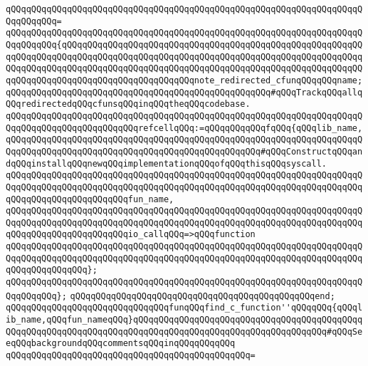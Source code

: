 \verb|qQQqqQQqqQQqqQQqqQQqqQQqqQQqqQQqqQQqqQQqqQQqqQQqqQQqqQQqqQQqqQQqqQQqqQQqqQQqqQQq=|\newline
\verb|qQQqqQQqqQQqqQQqqQQqqQQqqQQqqQQqqQQqqQQqqQQqqQQqqQQqqQQqqQQqqQQqqQQqqQQqqQQqqQQq{qQQqqQQqqQQqqQQqqQQqqQQqqQQqqQQqqQQqqQQqqQQqqQQqqQQqqQQqqQQqqQQqqQQqqQQqqQQqqQQqqQQqqQQqqQQqqQQqqQQqqQQqqQQqqQQqqQQqqQQqqQQqqQQqqQQqqQQqqQQqqQQqqQQqqQQqqQQqqQQqqQQqqQQqqQQqqQQqqQQqqQQqqQQqqQQqqQQqqQQqqQQqqQQqqQQqqQQqqQQqqQQqqQQqqQQqqQQqnote_redirected_cfunqQQqqQQqname;qQQqqQQqqQQqqQQqqQQqqQQqqQQqqQQqqQQqqQQqqQQqqQQqqQQq#qQQqTrackqQQqallqQQqredirectedqQQqcfunsqQQqinqQQqtheqQQqcodebase.|\newline
\newline
\verb|qQQqqQQqqQQqqQQqqQQqqQQqqQQqqQQqqQQqqQQqqQQqqQQqqQQqqQQqqQQqqQQqqQQqqQQqqQQqqQQqqQQqqQQqqQQqqQQqrefcellqQQq:=qQQqqQQqqQQqfqQQq{qQQqlib_name,qQQqqQQqqQQqqQQqqQQqqQQqqQQqqQQqqQQqqQQqqQQqqQQqqQQqqQQqqQQqqQQqqQQqqQQqqQQqqQQqqQQqqQQqqQQqqQQqqQQqqQQqqQQqqQQqqQQqqQQq#qQQqConstructqQQqandqQQqinstallqQQqnewqQQqimplementationqQQqofqQQqthisqQQqsyscall.|\newline
\verb|qQQqqQQqqQQqqQQqqQQqqQQqqQQqqQQqqQQqqQQqqQQqqQQqqQQqqQQqqQQqqQQqqQQqqQQqqQQqqQQqqQQqqQQqqQQqqQQqqQQqqQQqqQQqqQQqqQQqqQQqqQQqqQQqqQQqqQQqqQQqqQQqqQQqqQQqqQQqqQQqqQQqfun_name,|\newline
\verb|qQQqqQQqqQQqqQQqqQQqqQQqqQQqqQQqqQQqqQQqqQQqqQQqqQQqqQQqqQQqqQQqqQQqqQQqqQQqqQQqqQQqqQQqqQQqqQQqqQQqqQQqqQQqqQQqqQQqqQQqqQQqqQQqqQQqqQQqqQQqqQQqqQQqqQQqqQQqqQQqqQQqio_callqQQq=>qQQqfunction|\newline
\verb|qQQqqQQqqQQqqQQqqQQqqQQqqQQqqQQqqQQqqQQqqQQqqQQqqQQqqQQqqQQqqQQqqQQqqQQqqQQqqQQqqQQqqQQqqQQqqQQqqQQqqQQqqQQqqQQqqQQqqQQqqQQqqQQqqQQqqQQqqQQqqQQqqQQqqQQqqQQq};|\newline
\verb|qQQqqQQqqQQqqQQqqQQqqQQqqQQqqQQqqQQqqQQqqQQqqQQqqQQqqQQqqQQqqQQqqQQqqQQqqQQqqQQq};|\newline
\verb|qQQqqQQqqQQqqQQqqQQqqQQqqQQqqQQqqQQqqQQqqQQqqQQqend;|\newline
\newline
\verb|qQQqqQQqqQQqqQQqqQQqqQQqqQQqqQQqfunqQQqfind_c_function''qQQqqQQq{qQQqlib_name,qQQqfun_nameqQQq}qQQqqQQqqQQqqQQqqQQqqQQqqQQqqQQqqQQqqQQqqQQqqQQqqQQqqQQqqQQqqQQqqQQqqQQqqQQqqQQqqQQqqQQqqQQqqQQqqQQqqQQqqQQq#qQQqSeeqQQqbackgroundqQQqcommentsqQQqinqQQqqQQqqQQq|\newline
\verb|qQQqqQQqqQQqqQQqqQQqqQQqqQQqqQQqqQQqqQQqqQQqqQQq=|\newline
